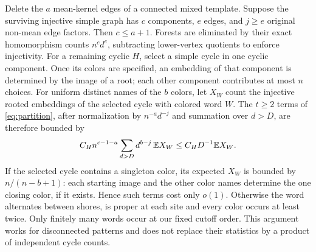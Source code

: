 Delete the $a$ mean-kernel edges of a connected mixed template. Suppose the surviving injective simple graph has $c$ components, $e$ edges, and $j\ge e$ original non-mean edge factors. Then $c\le a+1$. Forests are eliminated by their exact homomorphism counts $n^c d^e$, subtracting lower-vertex quotients to enforce injectivity. For a remaining cyclic $H$, select a simple cycle in one cyclic component. Once its colors are specified, an embedding of that component is determined by the image of a root; each other component contributes at most $n$ choices. For uniform distinct names of the $b$ colors, let $X_W$ count the injective rooted embeddings of the selected cycle with colored word $W$. The $t\ge2$ terms of \eqref{eq:partition}, after normalization by $n^{-a}d^{-j}$ and summation over $d>D$, are therefore bounded by
\[
  C_H n^{c-1-a}\sum_{d>D}d^{b-j}\,\mathbb E X_W
                    \le C_H D^{-1}\mathbb E X_W .
\]
If the selected cycle contains a singleton color, its expected $X_W$ is bounded by $n/(n-b+1)$: each starting image and the other color names determine the one closing color, if it exists. Hence such terms cost only $o(1)$. Otherwise the word alternates between shores, is proper at each site and every color occurs at least twice. Only finitely many words occur at our fixed cutoff order. This argument works for disconnected patterns and does not replace their statistics by a product of independent cycle counts.

